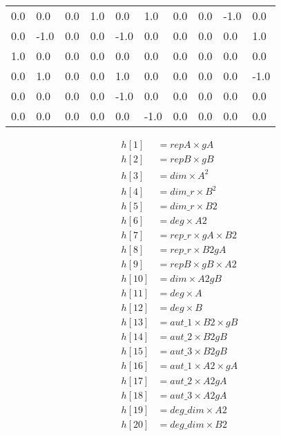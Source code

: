 \begin{table}[htbp]
\begin{tabular}{@{}llllllllll@{}}
    0.0&    0.0&    0.0    &1.0     &0.0     &1.0  &   0.0  &   0.0  &   -1.0 &    0.0 \\
    0.0 &   -1.0&    0.0&    0.0 &    -1.0    & 0.0 &    0.0 &    0.0 &    0.0 &    1.0 \\
    1.0  &  0.0  &  0.0  &  0.0   &  0.0 &    0.0    & 0.0    & 0.0    & 0.0    & 0.0 \\
    0.0   & 1.0   & 0.0   & 0.0    & 1.0  &   0.0     &0.0     &0.0     &0.0     &-1.0 \\
    0.0    &0.0    &0.0    &0.0     &-1.0  &   0.0     &0.0     &0.0     &0.0     &0.0 \\
    0.0   & 0.0    &0.0    &0.0     &0.0    & -1.0     &0.0     &0.0     &0.0     &0.0 \\

\end{tabular}
\end{table}


\begin{align*}
    h[1] &= repA \times gA\\
    h[2] &= repB \times gB\\
    h[3] &= dim \times A^2\\
    h[4] &= dim\_r \times B^2\\
    h[5] &= dim\_r \times B2\\
    h[6] &= deg \times A2\\
    h[7] &= rep\_r \times gA \times B2\\
    h[8] &= rep\_r \times B2gA\\
    h[9] &= repB \times gB \times A2\\
    h[10] &= dim \times A2gB\\
    h[11] &= deg \times A\\
    h[12] &= deg \times B\\
    h[13] &= aut\_1 \times B2 \times gB\\
    h[14] &= aut\_2 \times B2gB\\
    h[15] &= aut\_3 \times B2gB\\
    h[16] &= aut\_1 \times A2 \times gA\\
    h[17] &= aut\_2 \times A2gA\\
    h[18] &= aut\_3 \times A2gA\\   
    h[19] &= deg\_dim \times A2\\
    h[20] &= deg\_dim \times B2
\end{align*}



